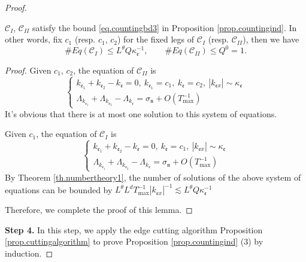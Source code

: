 \begin{proof}
\begin{lem}\label{lem.countingbdunit}
$\mathcal{C}_{I}$, $\mathcal{C}_{II}$ satisfy the bound \eqref{eq.countingbd3} in Proposition \ref{prop.countingind}. In other words, fix $c_1$ (resp. $c_1$, $c_2$) for the fixed legs of $\mathcal{C}_{I}$ (resp. $\mathcal{C}_{II}$), then we have 
\begin{equation}\label{eq.countingbdunit}
    \# Eq(\mathcal{C}_{I})\leq L^\theta Q\kappa^{-1}_{\mathfrak{e}},\qquad \# Eq(\mathcal{C}_{II})\leq Q^0=1.
\end{equation}
\end{lem}
\begin{proof} Given $c_1$, $c_2$, the equation of $\mathcal{C}_{II}$ is 
\begin{equation}
    \begin{cases}
    k_{\mathfrak{e}_1}+k_{\mathfrak{e}_2}-k_{\mathfrak{e}}=0,\ k_{\mathfrak{e}_1}=c_1,\ k_{\mathfrak{e}}=c_2,\ |k_{\mathfrak{e}x}|\sim \kappa_{\mathfrak{e}}
    \\
    \Lambda_{k_{\mathfrak{e}_1}}+\Lambda_{k_{\mathfrak{e}_2}}-\Lambda_{k_{\mathfrak{e}}}=\sigma_{\mathfrak{n}}+O(T^{-1}_{\text{max}})
    \end{cases}
\end{equation}
It's obvious that there is at most one solution to this system of equations.

Given $c_1$, the equation of $\mathcal{C}_{I}$ is 
\begin{equation}
    \begin{cases}
    k_{\mathfrak{e}_1}+k_{\mathfrak{e}_2}-k_{\mathfrak{e}}=0,\ k_{\mathfrak{e}}=c_1,\ |k_{\mathfrak{e}x}|\sim \kappa_{\mathfrak{e}}
    \\
    \Lambda_{k_{\mathfrak{e}_1}}+\Lambda_{k_{\mathfrak{e}_2}}-\Lambda_{k_{\mathfrak{e}}}=\sigma_{\mathfrak{n}}+O(T^{-1}_{\text{max}})
    \end{cases}
\end{equation}
By Theorem \ref{th.numbertheory1}, the number of solutions of the above system of equations can be bounded by $L^\theta L^dT^{-1}_{\text{max}}|k_{\mathfrak{e}x}|^{-1}\lesssim L^\theta Q\kappa^{-1}_{\mathfrak{e}}$

Therefore, we complete the proof of this lemma.
\end{proof}



\textbf{Step 4.} In this step, we apply the edge cutting algorithm Proposition \ref{prop.cuttingalgorithm} to prove Proposition \ref{prop.countingind} (3) by induction.


\end{proof}
